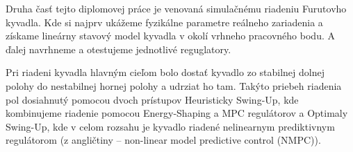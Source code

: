 Druha časť tejto diplomovej práce je venovaná simulačnému riadeniu Furutovho kyvadla. Kde si najprv ukážeme fyzikálne parametre reálneho zariadenia a získame lineárny stavový model kyvadla v okolí vrhneho pracovného bodu. A ďalej navrhneme a otestujeme jednotlivé reguglatory.

Pri riadeni kyvadla hlavným cieľom bolo dostať kyvadlo zo stabilnej dolnej polohy do nestabilnej hornej polohy a udrziat ho tam. Takýto priebeh riadenia pol dosiahnutý pomocou dvoch prístupov Heuristicky Swing-Up, kde kombinujeme riadenie pomocou Energy-Shaping a MPC regulátorov a Optimaly Swing-Up, kde v celom rozsahu je kyvadlo riadené nelinearnym prediktivnym regulátorom (z angličtiny – non-linear model predictive control (NMPC)).

